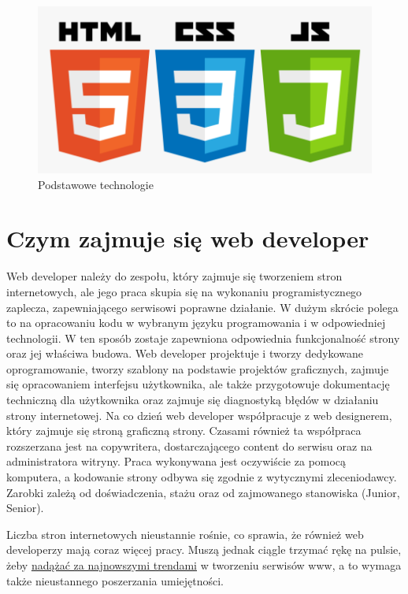 \documentclass[12pt]{report}
\begin{document}
	\begin{figure}[h]
	\centering
	\includegraphics[scale=0.25]{3.png}
	\caption{Podstawowe technologie}
	\end{figure}
	\cite{webd}
	
	\newpage
	\section{Czym zajmuje się web developer}
	Web developer należy do zespołu, który zajmuje się tworzeniem stron internetowych, ale jego praca skupia się na wykonaniu programistycznego zaplecza, zapewniającego serwisowi poprawne działanie. W dużym skrócie polega to na opracowaniu kodu w wybranym języku programowania i w odpowiedniej technologii. W ten sposób zostaje zapewniona odpowiednia funkcjonalność strony oraz jej właściwa budowa. Web developer projektuje i tworzy dedykowane oprogramowanie, tworzy szablony na podstawie projektów graficznych, zajmuje się opracowaniem interfejsu użytkownika, ale także przygotowuje dokumentację techniczną dla użytkownika oraz zajmuje się diagnostyką błędów w działaniu strony internetowej.
	Na co dzień web developer współpracuje z web designerem, który zajmuje się stroną graficzną strony. Czasami również ta współpraca rozszerzana jest na copywritera, dostarczającego content do serwisu oraz na administratora witryny. Praca wykonywana jest oczywiście za pomocą komputera, a kodowanie strony odbywa się zgodnie z wytycznymi zleceniodawcy. Zarobki zależą od doświadczenia, stażu oraz od zajmowanego stanowiska (Junior, Senior). 
	\par
	Liczba stron internetowych nieustannie rośnie, co sprawia, że również web developerzy mają coraz więcej pracy. Muszą jednak ciągle trzymać rękę na pulsie, żeby \underline{nadążać za najnowszymi trendami} w tworzeniu serwisów www, a to wymaga także nieustannego poszerzania umiejętności.
	\cite{webd}
	
\end{document}

